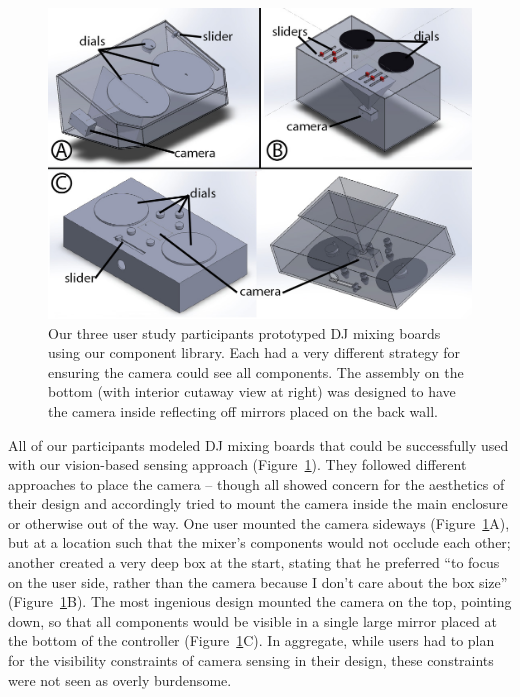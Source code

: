     \begin{figure}
\centering
\includegraphics[width=\textwidth]{figures/sauron/study-markup.jpg}
\caption{Our three user study participants prototyped DJ mixing boards using our component library. Each had a very different strategy for ensuring the camera could see all components. The assembly on the bottom (with interior cutaway view at right) was designed to have the camera inside reflecting off mirrors placed on the back wall.}
\label{fig:sauron-study}
\end{figure}

    All of our participants modeled DJ mixing boards that could be successfully used with our vision-based sensing approach (Figure~\ref{fig:sauron-study}). They followed different approaches to place the camera -- though all showed concern for the aesthetics of their design and accordingly tried to mount the camera inside the main enclosure or otherwise out of the way. One user mounted the camera sideways (Figure~\ref{fig:sauron-study}A), but at a location such that the mixer's components would not occlude each other; another created a very deep box at the start, stating that he preferred ``to focus on the user side, rather than the camera because I don't care about the box size'' (Figure~\ref{fig:sauron-study}B). The most ingenious design mounted the camera on the top, pointing down, so that all components would be visible in a single large mirror placed at the bottom of the controller (Figure~\ref{fig:sauron-study}C). In aggregate, while users had to plan for the visibility constraints of camera sensing in their design, these constraints were not seen as overly burdensome.

